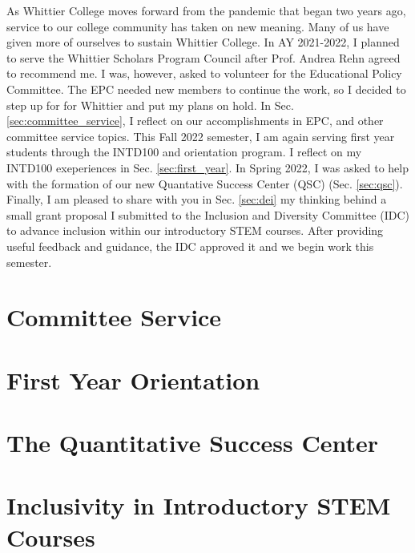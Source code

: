 \documentclass[../../main.tex]{subfiles}
\begin{document}
\label{sec:service}

As Whittier College moves forward from the pandemic that began two years ago, service to our college community has taken on new meaning.  Many of us have given more of ourselves to sustain Whittier College.  In AY 2021-2022, I planned to serve the Whittier Scholars Program Council after Prof. Andrea Rehn agreed to recommend me.  I was, however, asked to volunteer for the Educational Policy Committee.  The EPC needed new members to continue the work, so I decided to step up for for Whittier and put my plans on hold.  In Sec. \ref{sec:committee_service}, I reflect on our accomplishments in EPC, and other committee service topics.  This Fall 2022 semester, I am again serving first year students through the INTD100 and orientation program.  I reflect on my INTD100 exeperiences in Sec. \ref{sec:first_year}.  In Spring 2022, I was asked to help with the formation of our new Quantative Success Center (QSC) (Sec. \ref{sec:qsc}).  Finally, I am pleased to share with you in Sec. \ref{sec:dei} my thinking behind a small grant proposal I submitted to the Inclusion and Diversity Committee (IDC) to advance inclusion within our introductory STEM courses.  After providing useful feedback and guidance, the IDC approved it and we begin work this semester.

\section{Committee Service}

\begin{flushleft}

\end{flushleft}

\section{First Year Orientation}

\begin{flushleft}

\end{flushleft}

\section{The Quantitative Success Center}

\begin{flushleft}

\end{flushleft}

\section{Inclusivity in Introductory STEM Courses}

\begin{flushleft}

\end{flushleft}
\end{document}

